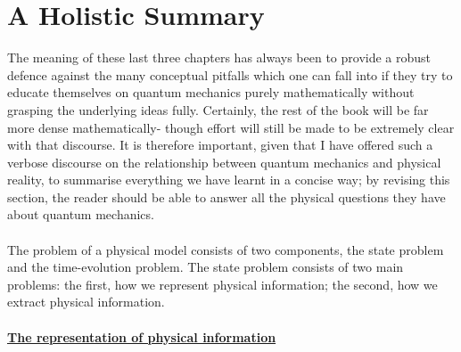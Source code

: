 \section{A Holistic Summary}
The meaning of these last three chapters has always been to provide a robust defence against the many conceptual pitfalls which one can fall into if they try to educate themselves on quantum mechanics purely mathematically without grasping the underlying ideas fully. Certainly, the rest of the book will be far more dense mathematically- though effort will still be made to be extremely clear with that discourse. It is therefore important, given that I have offered such a verbose discourse on the relationship between quantum mechanics and physical reality, to summarise everything we have learnt in a concise way; by revising this section, the reader should be able to answer all the physical questions they have about quantum mechanics.
\\\\
The problem of a physical model consists of two components, the state problem and the time-evolution problem. The state problem consists of two main problems: the first, how we represent physical information; the second, how we extract physical information.
\\\\
\textbf{\underline{The representation of physical information}}
